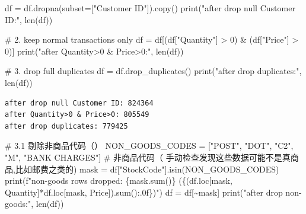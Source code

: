 \documentclass[
]{ctexart}
\newenvironment{Shaded}{\begin{snugshade}}{\end{snugshade}}
\newcommand{\BuiltInTok}[1]{\textcolor[rgb]{0.00,0.23,0.31}{#1}}
\newcommand{\CommentTok}[1]{\textcolor[rgb]{0.37,0.37,0.37}{#1}}
\newcommand{\DecValTok}[1]{\textcolor[rgb]{0.68,0.00,0.00}{#1}}
\newcommand{\NormalTok}[1]{\textcolor[rgb]{0.00,0.23,0.31}{#1}}
\newcommand{\OperatorTok}[1]{\textcolor[rgb]{0.37,0.37,0.37}{#1}}
\newcommand{\SpecialCharTok}[1]{\textcolor[rgb]{0.37,0.37,0.37}{#1}}
\newcommand{\SpecialStringTok}[1]{\textcolor[rgb]{0.13,0.47,0.30}{#1}}
\newcommand{\StringTok}[1]{\textcolor[rgb]{0.13,0.47,0.30}{#1}}
\begin{document}
\begin{Shaded}
\begin{Highlighting}[]
\NormalTok{df }\OperatorTok{=}\NormalTok{ df.dropna(subset}\OperatorTok{=}\NormalTok{[}\StringTok{"Customer ID"}\NormalTok{]).copy()}
\BuiltInTok{print}\NormalTok{(}\StringTok{"after drop null Customer ID:"}\NormalTok{, }\BuiltInTok{len}\NormalTok{(df))}

\CommentTok{\# 2. keep normal transactions only}
\NormalTok{df }\OperatorTok{=}\NormalTok{ df[(df[}\StringTok{"Quantity"}\NormalTok{] }\OperatorTok{\textgreater{}} \DecValTok{0}\NormalTok{) }\OperatorTok{\&}\NormalTok{ (df[}\StringTok{"Price"}\NormalTok{] }\OperatorTok{\textgreater{}} \DecValTok{0}\NormalTok{)]}
\BuiltInTok{print}\NormalTok{(}\StringTok{"after Quantity\textgreater{}0 \& Price\textgreater{}0:"}\NormalTok{, }\BuiltInTok{len}\NormalTok{(df))}

\CommentTok{\# 3. drop full duplicates}
\NormalTok{df }\OperatorTok{=}\NormalTok{ df.drop\_duplicates()}
\BuiltInTok{print}\NormalTok{(}\StringTok{"after drop duplicates:"}\NormalTok{, }\BuiltInTok{len}\NormalTok{(df))}
\end{Highlighting}
\end{Shaded}

\begin{verbatim}
after drop null Customer ID: 824364
after Quantity>0 & Price>0: 805549
after drop duplicates: 779425
\end{verbatim}

\begin{Shaded}
\begin{Highlighting}[]
\CommentTok{\# 3.1 剔除非商品代码（）}
\NormalTok{NON\_GOODS\_CODES }\OperatorTok{=}\NormalTok{ [}\StringTok{"POST"}\NormalTok{, }\StringTok{"DOT"}\NormalTok{, }\StringTok{"C2"}\NormalTok{, }\StringTok{"M"}\NormalTok{, }\StringTok{"BANK CHARGES"}\NormalTok{]  }\CommentTok{\# 非商品代码（ 手动检查发现这些数据可能不是\textquotesingle{}真商品\textquotesingle{},比如邮费之类的) }
\NormalTok{mask }\OperatorTok{=}\NormalTok{ df[}\StringTok{"StockCode"}\NormalTok{].isin(NON\_GOODS\_CODES)}
\BuiltInTok{print}\NormalTok{(}\SpecialStringTok{f"non{-}goods rows dropped: }\SpecialCharTok{\{}\NormalTok{mask}\SpecialCharTok{.}\BuiltInTok{sum}\NormalTok{()}\SpecialCharTok{\}}\SpecialStringTok{  (}\SpecialCharTok{\{}\NormalTok{(df.loc[mask, }\StringTok{\textquotesingle{}Quantity\textquotesingle{}}\NormalTok{]}\OperatorTok{*}\NormalTok{df.loc[mask, }\StringTok{\textquotesingle{}Price\textquotesingle{}}\NormalTok{])}\SpecialCharTok{.}\BuiltInTok{sum}\NormalTok{()}\SpecialCharTok{:.0f\}}\SpecialStringTok{)"}\NormalTok{)}
\NormalTok{df }\OperatorTok{=}\NormalTok{ df[}\OperatorTok{\textasciitilde{}}\NormalTok{mask]}
\BuiltInTok{print}\NormalTok{(}\StringTok{"after drop non{-}goods:"}\NormalTok{, }\BuiltInTok{len}\NormalTok{(df))}
\end{Highlighting}
\end{Shaded}
\end{document}
